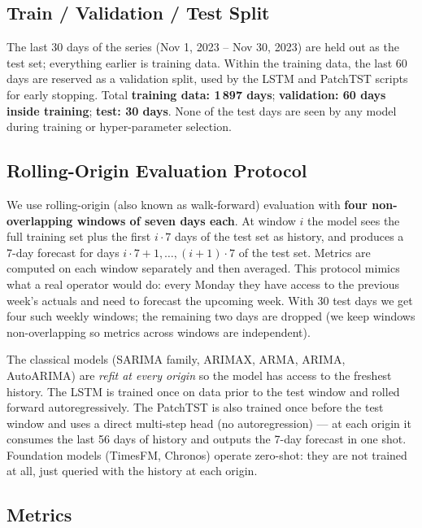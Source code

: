 \subsection{Train / Validation / Test Split}

The last 30 days of the series (Nov 1, 2023 -- Nov 30, 2023) are held
out as the test set; everything earlier is training data. Within the
training data, the last 60 days are reserved as a validation split,
used by the LSTM and PatchTST scripts for early stopping. Total
\textbf{training data: 1\,897 days}; \textbf{validation: 60 days
inside training}; \textbf{test: 30 days}. None of the test days are
seen by any model during training or hyper-parameter selection.

\subsection{Rolling-Origin Evaluation Protocol}

We use rolling-origin (also known as walk-forward) evaluation with
\textbf{four non-overlapping windows of seven days each}. At window
$i$ the model sees the full training set plus the first
$i \cdot 7$ days of the test set as history, and produces a 7-day
forecast for days $i \cdot 7 + 1, \dots, (i+1) \cdot 7$ of the test
set. Metrics are computed on each window separately and then averaged.
This protocol mimics what a real operator would do: every Monday they
have access to the previous week's actuals and need to forecast the
upcoming week. With 30 test days we get four such weekly windows; the
remaining two days are dropped (we keep windows non-overlapping so
metrics across windows are independent).

The classical models (SARIMA family, ARIMAX, ARMA, ARIMA, AutoARIMA)
are \emph{refit at every origin} so the model has access to the
freshest history. The LSTM is trained once on data prior to the test
window and rolled forward autoregressively. The PatchTST is also
trained once before the test window and uses a direct multi-step head
(no autoregression) --- at each origin it consumes the last 56 days
of history and outputs the 7-day forecast in one shot. Foundation
models (TimesFM, Chronos) operate zero-shot: they are not trained at
all, just queried with the history at each origin.

\subsection{Metrics}

